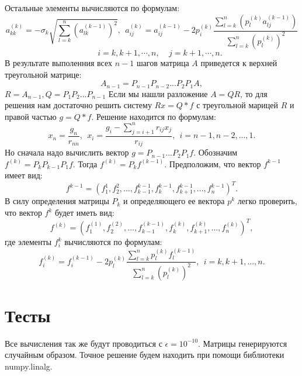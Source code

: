 \documentclass[14pt, titlepage,fleqn]{extarticle}
\begin{document}
	Остальные элементы вычисляются по формулам:
	\[a^{(k)}_{kk} = -\sigma_k \sqrt{\sum^{n}_{l=k}(a^{(k-1)}_{lk})^2}, ~~ a^{(k)}_{ij} = a^{(k-1)}_{ij} - 2p^{(k)}_{i} \dfrac{\sum^{n}_{l=k}(p^{(k)}_{l}a^{(k-1)}_{lj})}{\sum^{n}_{l=k}(p^{(k)}_{l})^2}\]
	\[~~~~~~~~~i = k, k+1, \cdots, n,~~~~~j=k+1,\cdots,n.\]
	\newpage
	В результате выполенния всех $n-1$ шагов матрица $A$ приведется к верхней треугольной матрице:
	\[A_{n-1} = P_{n-1}P_{n-2}...P_2P_1A,\]
	$R = A_{n-1}, Q = P_1P_2...P_{n-1}$
	Если мы нашли разложение $A = QR$, то для решения нам достаточно решить систему $Rx= Q*f$ с треугольной марицей $R$ и правой частью $g=Q*f$. Решение находится по формулам:
	\[x_n = \dfrac{g_n}{r_{nn}},~~ x_i = \dfrac{g_i - \sum^{n}_{j=i+1}r_{ij}x_j}{r_{ij}}, ~~i = n-1, n-2,...,1.\]
	Но сначала надо вычислить вектор $g = P_{n-1}...P_2P_1f.$ Обозначим $f^{(k)} = P_kP_{k-1}P_1f.$ Тогда $f^{(k)} = P_kf^{(k-1)}.$ Предположим, что вектор $f^{k-1}$ имеет вид:
	\[f^{k-1} = (f^{1}_{1}, f^{2}_{2},...,f^{k-1}_{k-1},f^{k-1}_{k},f^{k-1}_{k+1},...,f^{k-1}_{n})^T.\]
	В силу определения матрицы $P_k$ и определяющего ее вектора $p^k$ легко проверить, что вектор $f^k$ будет иметь вид:
	\[f^{(k)} = (f^{(1)}_{1}, f^{(2)}_{2}, ..., f^{(k-1)}_{k-1}, f^{(k)}_{k}, f^{(k)}_{k+1},...,f^{(k)}_{n})^T,\]
	где элементы $f^k_i$ вычисляются по формулам:
	\[f^{(k)}_{i} = f^{(k - 1)}_{i} - 2p^{(k)}_{l} \dfrac{\sum^{n}_{l=k}p^{(k)}_{l}f^{(k-1)}_{l}}{\sum^{n}_{l=k}(p^{(k)}_{l})^2},~~ i = k,k+1,...,n.\]
	\newpage
	\section*{Тесты}
	Все вычисления так же будут проводиться с $\epsilon=10^{-10}$.
	Матрицы генерируются случайным образом.
	Точное решение будем находить при помощи библиотеки numpy.linalg.
\end{document}
